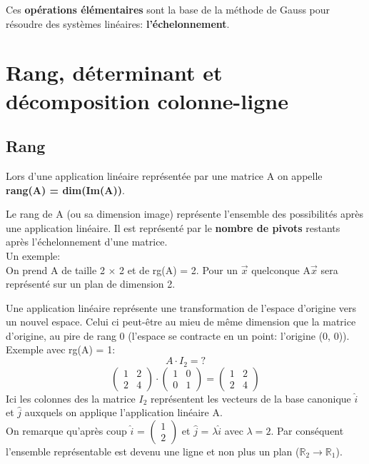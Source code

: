\documentclass[10pt,a4paper]{book}
\newcommand{\R}{\mathbb{R}}
\newcommand{\x}{$\times$ }
\begin{document}
Ces \textbf{opérations élémentaires} sont la base de la méthode de Gauss pour résoudre des systèmes linéaires: \textbf{l'échelonnement}.

\section{Rang, déterminant et décomposition colonne-ligne}

\subsection{Rang}
Lors d'une application linéaire représentée par une matrice A on appelle \textbf{rang(A) = dim(Im(A))}. \par
Le rang de A (ou sa dimension image) représente l'ensemble des possibilités après une application linéaire. Il est représenté par le \textbf{nombre de pivots} restants après l'échelonnement d'une matrice. \\
Un exemple: \\
On prend A de taille 2 \x 2 et de rg(A) = 2. Pour un $\vec{x}$ quelconque A$\vec{x}$ sera représenté sur un plan de dimension 2. \par
Une application linéaire représente une transformation de l'espace d'origine vers un nouvel espace. Celui ci peut-être au mieu de même dimension que la matrice d'origine, au pire de rang 0 (l'espace se contracte en un point: l'origine (0, 0)). \\
Exemple avec rg(A) = 1:
\[A \cdot I_2 = ?\]
\[\begin{pmatrix}
1 & 2 \\
2 & 4
\end{pmatrix}
\cdot
\begin{pmatrix}
1 & 0 \\
0 & 1
\end{pmatrix}
=
\begin{pmatrix}
1 & 2 \\
2 & 4
\end{pmatrix}
\]
Ici les colonnes des la matrice $I_2$ représentent les vecteurs de la base canonique $\hat{i}$ et $\hat{j}$ auxquels on applique l'application linéaire A. \\
On remarque qu'après coup $\hat{i}$ = \(\left(\begin{array}{c} 1 \\ 2 \end{array}\right)\) et $\hat{j}$ = \(\lambda \hat{i}\) avec $\lambda = 2$. Par conséquent l'ensemble représentable est devenu une ligne et non plus un plan ($\R_2 \rightarrow \R_1$).
\end{document}

